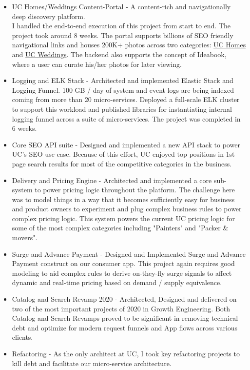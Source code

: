 \documentclass{article}
\begin{document}
\begin{itemize}[leftmargin=-1ex]
\begin{itemize}
		\item \href{https://urbanclap.com/weddings} {UC Homes/Weddings Content-Portal} - A content-rich and navigationally deep discovery platform. \\ I handled the end-to-end execution of this project from start to end. The project took around 8 weeks. The portal supports billions of SEO friendly navigational links and houses 200K+ photos across two categories: \href{https://urbanclap.com/homes} {UC Homes} and \href{https://urbanclap.com/weddings} {UC Weddings}. The backend also supports the concept of Ideabook, where a user can curate his/her photos for later viewing.
		\item {Logging and ELK Stack} - Architected and implemented Elastic Stack and Logging Funnel. 100 GB / day of system and event logs are being indexed coming from more than 20 micro-services. Deployed a full-scale ELK cluster to support this workload and published libraries for instantiating internal logging funnel across a suite of micro-services. The project was completed in 6 weeks. 
		\item {Core SEO API suite} - Designed and implemented a new API stack to power UC's SEO use-case. Because of this effort, UC enjoyed top positions in 1st page search results for most of the competitive categories in the business. 
		\item {Delivery and Pricing  Engine} - Architected and implemented a core sub-system to power pricing logic throughout the platform. The challenge here was to model things in a way that it becomes sufficiently easy for business and product owners to experiment and plug complex business rules to power complex pricing logic. This system powers the current UC pricing logic for some of the most complex categories including "Painters" and "Packer \& movers". 
		\item {Surge and Advance Payment} - Designed and Implemented Surge and Advance Payment construct on our consumer app. This project again requires good modeling to aid complex rules to derive on-they-fly surge signals to affect dynamic and real-time pricing based on demand / supply equivalence.
		\item {Catalog and Search Revamp 2020} - Architected, Designed and delivered on two of the most important projects of 2020 in Growth Engineering. Both Catalog and Search Revamps proved to be significant in removing technical debt and optimize for modern request funnels and App flows across various clients.
		\item {Refactoring} - As the only architect at UC, I took key refactoring projects to kill debt and facilitate our micro-service architecture.
		

\end{itemize}
\end{itemize}
\end{document}
